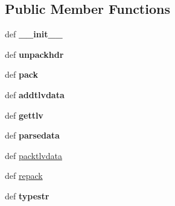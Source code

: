 \subsection*{Public Member Functions}
\begin{DoxyCompactItemize}
\item 
\hypertarget{classcore_1_1api_1_1coreapi_1_1_core_message_a22266fc96c90ed47a0d66d260079e83e}{def {\bfseries \+\_\+\+\_\+init\+\_\+\+\_\+}}\label{classcore_1_1api_1_1coreapi_1_1_core_message_a22266fc96c90ed47a0d66d260079e83e}

\item 
\hypertarget{classcore_1_1api_1_1coreapi_1_1_core_message_af347cc443590a1b903609c6d9692d68d}{def {\bfseries unpackhdr}}\label{classcore_1_1api_1_1coreapi_1_1_core_message_af347cc443590a1b903609c6d9692d68d}

\item 
\hypertarget{classcore_1_1api_1_1coreapi_1_1_core_message_a627c1f400b4d6b2f20975c06b43211d2}{def {\bfseries pack}}\label{classcore_1_1api_1_1coreapi_1_1_core_message_a627c1f400b4d6b2f20975c06b43211d2}

\item 
\hypertarget{classcore_1_1api_1_1coreapi_1_1_core_message_a6e7af01d15ec9c2e7b63b6604459e98a}{def {\bfseries addtlvdata}}\label{classcore_1_1api_1_1coreapi_1_1_core_message_a6e7af01d15ec9c2e7b63b6604459e98a}

\item 
\hypertarget{classcore_1_1api_1_1coreapi_1_1_core_message_a94cf7baa30cebccd950489176ad81697}{def {\bfseries gettlv}}\label{classcore_1_1api_1_1coreapi_1_1_core_message_a94cf7baa30cebccd950489176ad81697}

\item 
\hypertarget{classcore_1_1api_1_1coreapi_1_1_core_message_aa5b10cafdf5131033aa90f9e8de1e8da}{def {\bfseries parsedata}}\label{classcore_1_1api_1_1coreapi_1_1_core_message_aa5b10cafdf5131033aa90f9e8de1e8da}

\item 
def \hyperlink{classcore_1_1api_1_1coreapi_1_1_core_message_af660aada89cc0bae74037e415167de4e}{packtlvdata}
\item 
def \hyperlink{classcore_1_1api_1_1coreapi_1_1_core_message_a85d12fd7480976225a0043b4a05e26ef}{repack}
\item 
\hypertarget{classcore_1_1api_1_1coreapi_1_1_core_message_a2346e2c6689ebbe29f5cef7080fe0736}{def {\bfseries typestr}}\label{classcore_1_1api_1_1coreapi_1_1_core_message_a2346e2c6689ebbe29f5cef7080fe0736}


\end{DoxyCompactItemize}
